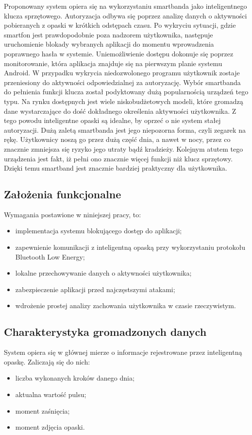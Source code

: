 \indent Proponowany system opiera się na wykorzystaniu smartbanda jako inteligentnego klucza sprzętowego. Autoryzacja odbywa się poprzez analizę danych o
aktywności pobieranych z opaski w krótkich odstępach czasu. Po wykryciu sytuacji, gdzie smartfon jest prawdopodobnie poza nadzorem użytkownika,
następuje uruchomienie blokady wybranych aplikacji do momentu wprowadzenia poprawnego hasła w systemie. Uniemożliwienie dostępu dokonuje się poprzez
monitorowanie, która aplikacja znajduje się na pierwszym planie systemu Android. W przypadku wykrycia niedozwolonego programu użytkownik zostaje
przeniesiony do aktywności odpowiedzialnej za autoryzację.
\newline\newline
\indent Wybór smartbanda do pełnienia funkcji klucza został podyktowany dużą popularnością urządzeń tego typu. Na rynku dostępnych jest wiele niskobudżetowych
modeli, które gromadzą dane wystarczające do dość dokładnego określenia aktywności użytkownika. Z tego powodu inteligentne opaski są idealne, by oprzeć
o nie system stałej autoryzacji. Dużą zaletą smartbanda jest jego niepozorna forma, czyli zegarek na rękę. Użytkownicy noszą go przez dużą
część dnia, a nawet w nocy, przez co znacznie zmniejsza się ryzyko jego utraty bądź kradzieży. Kolejnym atutem tego urządzenia jest fakt, iż pełni ono znacznie więcej funkcji niż klucz sprzętowy. Dzięki temu smartband jest znacznie bardziej praktyczny dla użytkownika.

\subsection{Założenia funkcjonalne}
Wymagania postawione w niniejszej pracy, to:
\begin{itemize}
    \item implementacja systemu blokującego dostęp do aplikacji;
    \item zapewnienie komunikacji z inteligentną opaską przy wykorzystaniu protokołu Bluetooth Low Energy;
    \item lokalne przechowywanie danych o aktywności użytkownika;
    \item zabezpieczenie aplikacji przed najczęstszymi atakami;
    \item wdrożenie prostej analizy zachowania użytkownika w czasie rzeczywistym.
\end{itemize}

\subsection{Charakterystyka gromadzonych danych}
System opiera się w głównej mierze o informacje rejestrowane przez inteligentną opaskę. Zaliczają się do nich:
\begin{itemize}
    \item liczba wykonanych kroków danego dnia;
    \item aktualna wartość pulsu;
    \item moment zaśnięcia;
    \item moment zdjęcia opaski.
\end{itemize}

